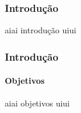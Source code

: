 \begin{frame}
\frametitle{Introdução}

aiai introdução uiui

\end{frame}

\begin{frame}
\frametitle{Introdução}
\framesubtitle{Objetivos}

aiai objetivos uiui

\end{frame}

